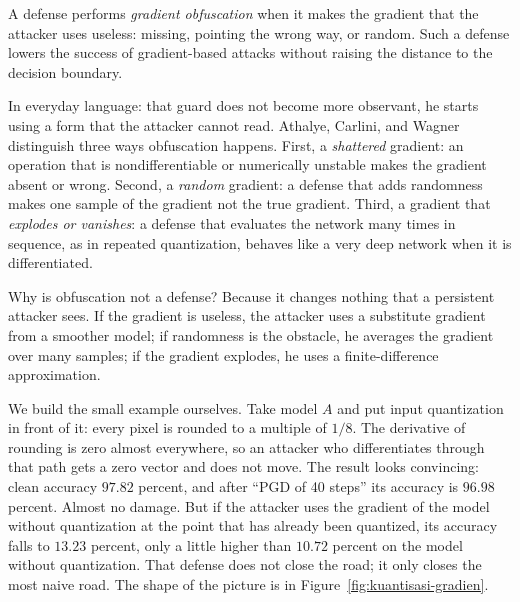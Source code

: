 \begin{definisi}
A defense performs \emph{gradient obfuscation} when it makes the gradient that the
attacker uses useless: missing, pointing the wrong way, or random. Such a defense
lowers the success of gradient-based attacks without raising the distance to the
decision boundary.
\end{definisi}

In everyday language: that guard does not become more observant, he starts using a
form that the attacker cannot read. Athalye, Carlini, and Wagner distinguish three
ways obfuscation happens. First, a \emph{shattered} gradient: an operation that is
nondifferentiable or numerically unstable makes the gradient absent or wrong. Second,
a \emph{random} gradient: a defense that adds randomness makes one sample of the
gradient not the true gradient. Third, a gradient that \emph{explodes or vanishes}: a
defense that evaluates the network many times in sequence, as in repeated
quantization, behaves like a very deep network when it is differentiated.

Why is obfuscation not a defense? Because it changes nothing that a persistent
attacker sees. If the gradient is useless, the attacker uses a substitute gradient
from a smoother model; if randomness is the obstacle, he averages the gradient over
many samples; if the gradient explodes, he uses a finite-difference approximation.

We build the small example ourselves. Take model $A$ and put input quantization in
front of it: every pixel is rounded to a multiple of $1/8$. The derivative of rounding
is zero almost everywhere, so an attacker who differentiates through that path gets a
zero vector and does not move. The result looks convincing: clean accuracy
$97.82$ percent, and after ``PGD of 40 steps'' its accuracy is $96.98$ percent. Almost
no damage. But if the attacker uses the gradient of the model without quantization at
the point that has already been quantized, its accuracy falls to $13.23$ percent, only
a little higher than $10.72$ percent on the model without quantization. That defense
does not close the road; it only closes the most naive road. The shape of the picture
is in Figure~\ref{fig:kuantisasi-gradien}.

